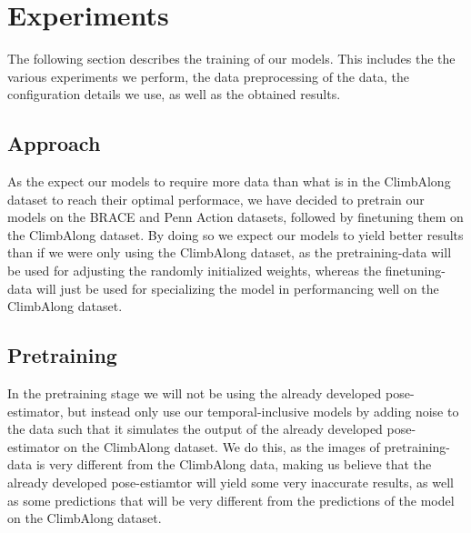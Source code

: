 \documentclass[./main.tex]{subfiles}
\begin{document}
\section{Experiments}
The following section describes the training of our models. This includes the the various experiments we perform, the data preprocessing of the data, the configuration details we use, as well as the obtained results.

\subsection{Approach}
As the expect our models to require more data than what is in the ClimbAlong dataset to reach their optimal performace, we have decided to pretrain our models on the BRACE and Penn Action datasets, followed by finetuning them on the ClimbAlong dataset. By doing so we expect our models to yield better results than if we were only using the ClimbAlong dataset, as the pretraining-data will be used for adjusting the randomly initialized weights, whereas the finetuning-data will just be used for specializing the model in performancing well on the ClimbAlong dataset.

\subsection{Pretraining}
In the pretraining stage we will not be using the already developed pose-estimator, but instead only use our temporal-inclusive models by adding noise to the data such that it simulates the output of the already developed pose-estimator on the ClimbAlong dataset. We do this, as the images of pretraining-data is very different from the ClimbAlong data, making us believe that the already developed pose-estiamtor will yield some very inaccurate results, as well as some predictions that will be very different from the predictions of the model on the ClimbAlong dataset.
\end{document}

